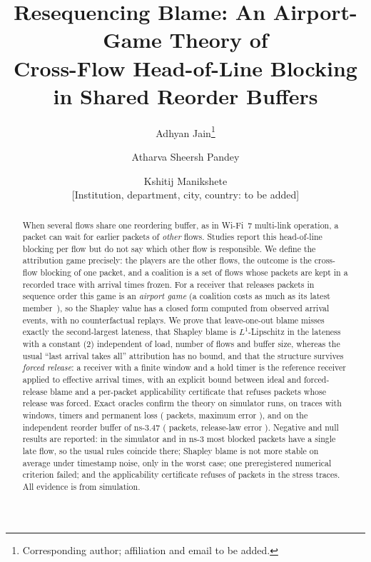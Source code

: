 \documentclass[11pt]{article}
\title{Resequencing Blame: An Airport-Game Theory of\\Cross-Flow Head-of-Line Blocking in Shared Reorder Buffers}
\author{Adhyan Jain\thanks{Corresponding author; affiliation and email to be added.} \and Atharva Sheersh Pandey \and Kshitij Manikshete\\[2pt]\small [Institution, department, city, country: to be added]}
\date{}
\theoremstyle{definition}
\begin{document}
\maketitle

\begin{abstract}
When several flows share one reordering buffer, as in Wi-Fi~7 multi-link operation, a packet can wait for earlier packets of \emph{other} flows. Studies report this head-of-line blocking per flow but do not say which other flow is responsible.
We define the attribution game precisely: the players are the other flows, the outcome is the cross-flow blocking of one packet, and a coalition is a set of flows whose packets are kept in a recorded trace with arrival times frozen.
For a receiver that releases packets in sequence order this game is an \emph{airport game} (a coalition costs as much as its latest member~\cite{littlechild1973airport}), so the Shapley value has a closed form computed from observed arrival events, with no counterfactual replays.
We prove that leave-one-out blame misses exactly the second-largest lateness, that Shapley blame is $L^1$-Lipschitz in the lateness with a constant (2) independent of load, number of flows and buffer size, whereas the usual ``last arrival takes all'' attribution has no bound, and that the structure survives \emph{forced release}: a receiver with a finite window and a hold timer is the reference receiver applied to effective arrival times, with an explicit bound between ideal and forced-release blame and a per-packet applicability certificate that refuses packets whose release was forced.
Exact oracles confirm the theory on \FvSimRuns{} simulator runs, on \FvSxTraces{} traces with windows, timers and permanent loss (\FvSxPackets{} packets, maximum error \FvSxErr{}), and on the independent reorder buffer of ns-3.47 (\FvNsSixPackets{} packets, release-law error \FvNsSixErr{}).
Negative and null results are reported: in the simulator and in ns-3 most blocked packets have a single late flow, so the usual rules coincide there; Shapley blame is not more stable on average under timestamp noise, only in the worst case; one preregistered numerical criterion failed; and the applicability certificate refuses \FvSxCertRef{} of packets in the stress traces.
All evidence is from simulation.
\end{abstract}
\end{document}
